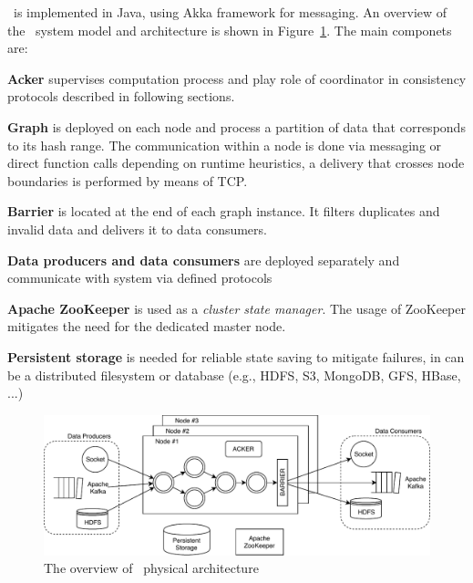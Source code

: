 \FlameStream\ is implemented in Java, using Akka framework for messaging. An overview of the \FlameStream\ system model and architecture is shown in Figure~\ref{arch}. The main componets are:

{\bf Acker} supervises computation process and play role of coordinator in consistency protocols described in following sections.

{\bf Graph} is deployed on each node and process a partition of data that corresponds to its hash range. The communication within a node is done via messaging or direct function calls depending on runtime heuristics, a delivery that crosses node boundaries is performed by means of TCP.

{\bf Barrier} is located at the end of each graph instance. It filters duplicates and invalid data and delivers it to data consumers.

{\bf Data producers and data consumers} are deployed separately and communicate with system via defined protocols

{\bf Apache ZooKeeper} is used as a {\it cluster state manager}. The usage of ZooKeeper mitigates the need for the dedicated master node.

{\bf Persistent storage} is needed for reliable state saving to mitigate failures, in can be a distributed filesystem or database (e.g., HDFS, S3, MongoDB, GFS, HBase, ...)


\begin{figure}[htbp]
  \centering
  \includegraphics[scale=0.78]{pics/arch}
  \caption{The overview of \FlameStream\ physical architecture}
  \label {arch}
\end{figure}


